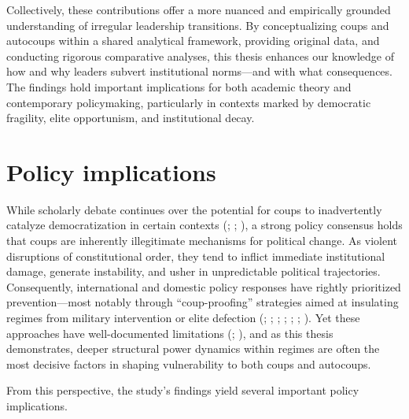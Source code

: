 \documentclass[
  12pt,
]{report}
\begin{document}
Collectively, these contributions offer a more nuanced and empirically
grounded understanding of irregular leadership transitions. By
conceptualizing coups and autocoups within a shared analytical
framework, providing original data, and conducting rigorous comparative
analyses, this thesis enhances our knowledge of how and why leaders
subvert institutional norms---and with what consequences. The findings
hold important implications for both academic theory and contemporary
policymaking, particularly in contexts marked by democratic fragility,
elite opportunism, and institutional decay.

\section{Policy implications}\label{policy-implications}

While scholarly debate continues over the potential for coups to
inadvertently catalyze democratization in certain contexts
(;
;
), a strong policy consensus holds
that coups are inherently illegitimate mechanisms for political change.
As violent disruptions of constitutional order, they tend to inflict
immediate institutional damage, generate instability, and usher in
unpredictable political trajectories. Consequently, international and
domestic policy responses have rightly prioritized prevention---most
notably through ``coup-proofing'' strategies aimed at insulating regimes
from military intervention or elite defection
(;
;
;
;
;
;
). Yet these approaches have
well-documented limitations (; ), and as this thesis
demonstrates, deeper structural power dynamics within regimes are often
the most decisive factors in shaping vulnerability to both coups and
autocoups.

From this perspective, the study's findings yield several important
policy implications.
\end{document}
